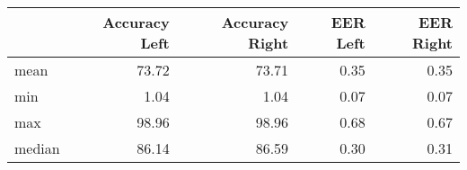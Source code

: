 \begin{tabular}{lrrrr}
\toprule
{} &  Accuracy Left &  Accuracy Right &  EER Left &  EER Right \\
\midrule
mean   &          73.72 &           73.71 &      0.35 &       0.35 \\
min    &           1.04 &            1.04 &      0.07 &       0.07 \\
max    &          98.96 &           98.96 &      0.68 &       0.67 \\
median &          86.14 &           86.59 &      0.30 &       0.31 \\
\bottomrule
\end{tabular}
